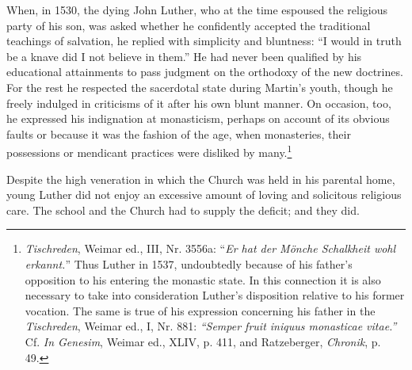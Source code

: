 When, in 1530, the dying John Luther, who
at the time espoused the religious party of his son, was asked
whether he confidently accepted the traditional teachings of salvation,
he replied with simplicity and bluntness: “I would in truth be a
knave did I not believe in them.” He had never been qualified
by his educational attainments to pass judgment on the orthodoxy
of the new doctrines. For the rest he respected the sacerdotal state
during Martin’s youth, though he freely indulged in criticisms of
it after his own blunt manner. On occasion, too, he expressed his
indignation at monasticism, perhaps on account of its obvious faults
or because it was the fashion of the age, when monasteries, their
possessions or mendicant practices were disliked by many.\footnote
{\textit{Tischreden}, Weimar ed., III, Nr. 3556a: ``\textit{Er hat der Mönche Schalkheit wohl erkannt.}''
Thus Luther in 1537, undoubtedly because of his father’s opposition to his entering the
monastic state. In this connection it is also necessary to take into consideration Luther’s
disposition relative to his former vocation. The same is true of his expression concerning his
father in the \textit{Tischreden}, Weimar ed., I, Nr. 881: \textit{“Semper fruit iniquus monasticae vitae.”}
Cf. \textit{In Genesim}, Weimar ed., XLIV, p. 411, and Ratzeberger, \textit{Chronik}, p. 49.}

Despite the high veneration in which the Church was held in his
parental home, young Luther did not enjoy an excessive amount of
loving and solicitous religious care. The school and the Church had
to supply the deficit; and they did.

